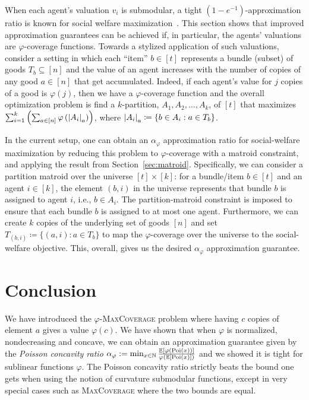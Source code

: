 When each agent's valuation $v_i$ is submodular, a tight $(1- e^{-1})$-approximation ratio is known for social welfare maximization~\cite{Vondrak07}. This section shows that improved approximation guarantees can be achieved if, in particular, the agents' valuations are $\varphi$-coverage functions. Towards a stylized application of such valuations, consider a setting in which each ``item'' $b \in [t]$ represents a bundle (subset) of goods $T_b \subseteq [n]$ and the value of an agent increases with the number of copies of any good $a \in [n]$ that get accumulated. Indeed, if each agent's value for $j$ copies of a good is $\varphi(j)$, then we have a $\varphi$-coverage function and the overall optimization problem is find a $k$-partition, $A_1, A_2, \ldots, A_k$, of $[t]$ that maximizes $\sum_{i=1}^k  \left( \sum_{a \in [n]} \varphi \left(\abs{A_i}_a \right) \right)$, where $ \abs{A_i}_a \coloneqq \{ b \in A_i : a \in T_b \}$. 

In the current setup, one can obtain an $\alpha_\varphi$ approximation ratio for social-welfare maximization by reducing this problem to $\varphi$-coverage with a matroid constraint, and applying the result from Section~\ref{sec:matroid}. Specifically, we can consider a partition matroid over the universe $[t] \times [k]$: for a bundle/item $b \in [t]$ and an agent $i \in [k]$, the element $(b,i)$ in the universe represents that bundle $b$ is assigned to agent $i$, i.e., $b \in A_i$. The partition-matroid constraint is imposed to ensure that each bundle $b$ is assigned to at most one agent. Furthermore, we can create $k$ copies of the underlying set of goods $[n]$ and set $T_{(b,i)} \coloneqq \{ (a, i) : a \in T_b \}$ to map the $\varphi$-coverage over the universe to the social-welfare objective. This, overall, gives us the desired  $\alpha_\varphi$ approximation guarantee.


 
\section{Conclusion}
We have introduced the $\varphi$-\textsc{MaxCoverage} problem where having $c$ copies of element $a$ gives a value $\varphi(c)$. We have shown that when $\varphi$ is normalized, nondecreasing and concave, we can obtain an approximation guarantee given by the \emph{Poisson concavity ratio} $\alpha_{\varphi} := \min_{x \in \mathbb{N}} \frac{\mathbb{E}[\varphi(\operatorname{\text{Poi}}(x))]}{\varphi(\mathbb{E}[\operatorname{\text{Poi}}(x)])}$ and we showed it is tight for sublinear functions $\varphi$. The Poisson concavity ratio strictly beats the bound one gets when using the notion of curvature submodular functions, except in very special cases such as \textsc{MaxCoverage} where the two bounds are equal.

